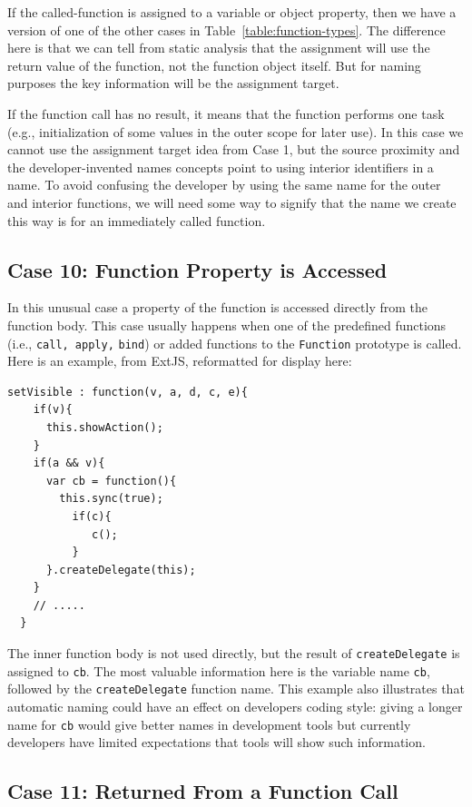 \documentclass[10pt, preprint]{sigplanconf}
\begin{document}
If the called-function is assigned to a variable or object property, then we have a version of one of the other cases in Table~\ref{table:function-types}. The difference here is that we can tell from static analysis that the assignment will use the return value of the function, not the function object itself. But for naming purposes the key information will be the assignment target.

If the function call has no result, it means that the function performs one task (e.g., initialization of some values in the outer scope for later use). In this case we cannot use the assignment target idea from Case 1, but the source proximity and the developer-invented names concepts point to using interior identifiers in a name. To avoid confusing the developer by using the same name for the outer and interior functions, we will need some way to signify that the name we create this way is for an immediately called function.

\subsection{Case 10: Function Property is Accessed}
\label{sec:funcprop}
In this unusual case a property of the function is accessed directly from the function body. This case usually happens when one of the predefined functions (i.e., \verb|call, apply,| \verb|bind|) or added functions to the \verb|Function| prototype is called.  Here is an example, from ExtJS, reformatted for display here:
\lstset{basicstyle=\scriptsize}
\begin{lstlisting}[frame=single, language=myLang]
  setVisible : function(v, a, d, c, e){
    if(v){
      this.showAction();
    }
    if(a && v){
      var cb = function(){
        this.sync(true);
          if(c){
             c();
          }
      }.createDelegate(this);
    }
    // .....
  }
\end{lstlisting}
The inner function body is not used directly, but the result of \verb|createDelegate| is assigned to \verb|cb|. The most valuable information here is the variable name \verb|cb|, followed by the \verb|createDelegate| function name.  This example also illustrates that automatic naming could have an effect on developers coding style:  giving a longer name for \verb|cb| would give better names in development tools but currently developers have limited expectations that tools will show such information.

\subsection{Case 11:  Returned From a Function Call}
\end{document}
